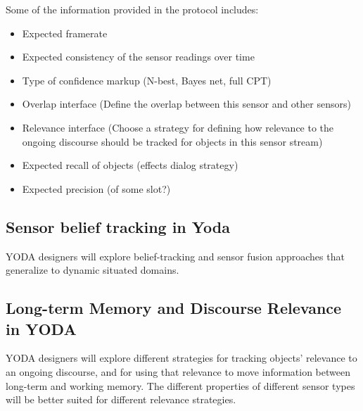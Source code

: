 \documentclass[10pt]{article}
\begin{document}
Some of the information provided in the protocol includes:
\begin{itemize}
\item Expected framerate
\item Expected consistency of the sensor readings over time
\item Type of confidence markup (N-best, Bayes net, full CPT)
\item Overlap interface (Define the overlap between this sensor and other sensors)
\item Relevance interface (Choose a strategy for defining how relevance to the ongoing discourse should be tracked for objects in this sensor stream)
\item Expected recall of objects (effects dialog strategy)
\item Expected precision (of some slot?)
\end{itemize}

\subsection {Sensor belief tracking in Yoda}
YODA designers will explore belief-tracking and sensor fusion approaches that generalize to dynamic situated domains.

\subsection {Long-term Memory and Discourse Relevance in YODA}
YODA designers will explore different strategies for tracking objects' relevance to an ongoing discourse, and for using that relevance to move information between long-term and working memory.
The different properties of different sensor types will be better suited for different relevance strategies.



\end{document}
